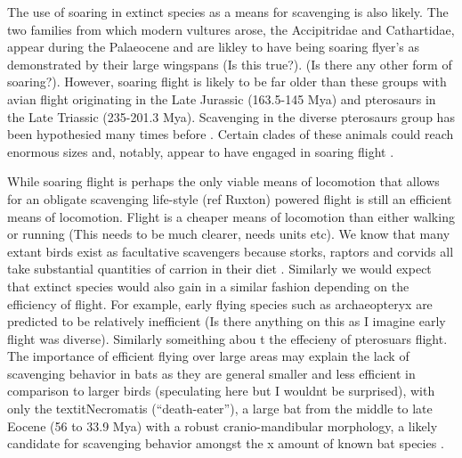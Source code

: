 \documentclass[a4paper,12pt]{article}
\begin{document}
The use of soaring in extinct species as a means for scavenging is also likely. The two families from which modern vultures arose, the Accipitridae and Cathartidae, appear during the Palaeocene \citep[66 - 56 Mya; ][]{Jetz2012, Jarvis2014} and are  likley to have being soaring flyer's as demonstrated by their large wingspans (Is this true?). (Is there any other form of soaring?). However, soaring flight is likely to be far older than these groups with avian flight originating in the Late Jurassic (163.5-145 Mya) and pterosaurs in the Late Triassic (235-201.3 Mya). Scavenging in the diverse pterosaurs group has been hypothesied many times before \citep{witton2008reappraisal}. Certain clades of these animals could reach enormous sizes \citep[e.g. Azhdarchids with wingspans of 11 metres; ][]{witton2010size} and, notably, appear to have engaged in soaring flight \citep{witton2010size}.

While soaring flight is perhaps the only viable means of locomotion that allows for an obligate scavenging life-style (ref Ruxton) powered flight is still an efficient means of locomotion. Flight is a cheaper means of locomotion than either walking or running \citep{tucker1975energetic} (This needs to be much clearer, needs units etc). We know that many extant birds exist as facultative scavengers because storks, raptors and corvids all take substantial quantities of carrion in their diet \citep{kendall2013alternative}. Similarly we would expect that extinct species would also gain in a similar fashion depending on the efficiency of flight. For example, early flying species such as archaeopteryx are predicted to be relatively inefficient (Is there anything on this as I imagine early flight was diverse). Similarly someithing abou t the effecieny of pterosuars flight. The importance of efficient flying over large areas may explain the lack of scavenging behavior in bats as they are general smaller and less efficient in comparison to larger birds (speculating here but I wouldnt be surprised), with only the textit{Necromatis} (``death-eater''), a large bat from the middle to late Eocene (56 to 33.9 Mya) with a robust cranio-mandibular morphology, a likely candidate for scavenging behavior amongst the x amount of known bat species \citep{Weithofer_Necromantis_1887,Hand_Necromantis_2012}.
\end{document}
